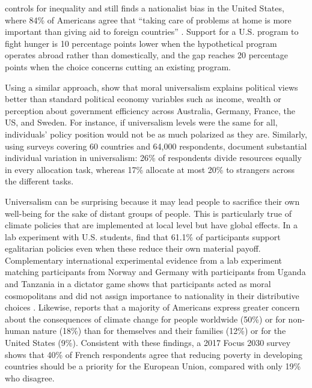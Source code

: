 \citet{prather_2013} controls for inequality and still finds a nationalist bias in the United States, where 84\% of Americans agree that ``taking care of problems at home is more important than giving aid to foreign countries'' \citep{PIPA2001}. Support for a U.S. program to fight hunger is 10 percentage points lower when the hypothetical program operates abroad rather than domestically, and the gap reaches 20 percentage points when the choice concerns cutting an existing program.

Using a similar approach, \citet{enke_moral_2023} show that moral universalism %
explains political views better than standard political economy variables such as income, wealth or perception about government efficiency across Australia, Germany, France, the US, and Sweden. For instance, if universalism levels were the same for all, individuals' policy position would not be as much polarized as they are. Similarly, using surveys covering 60 countries and 64,000 respondents, \citet{cappelen_universalism_2025} document substantial individual variation in universalism: 26\% of respondents divide resources equally in every allocation task, whereas 17\% allocate at most 20\% to strangers across the different tasks. %

Universalism can be surprising because it may lead people to sacrifice their own well-being for the sake of distant groups of people. This is particularly true of climate policies %
that are implemented at local level but have global effects. In a lab experiment with U.S. students, \citet{cherry_2017} find that 61.1\% of participants support egalitarian policies even when these reduce their own material payoff. Complementary international experimental evidence from a lab experiment matching participants from Norway and Germany with participants from Uganda and Tanzania in a dictator game shows that participants acted as moral cosmopolitans and did not assign importance to nationality in their distributive choices \citep{cappelen_needs_2013}. Likewise, \citet{leiserowitz_2006} reports that a majority of Americans express greater concern about the consequences of climate change for people worldwide (50\%) or for non-human nature (18\%) than for themselves and their families (12\%) or for the United States (9\%). Consistent with these findings, a 2017 Focus 2030 survey shows that 40\% of French respondents agree that reducing poverty in developing countries should be a priority for the European Union, compared with only 19\% who disagree.

